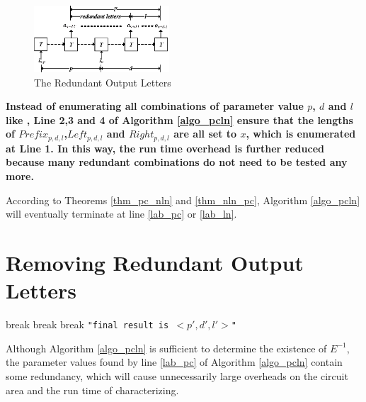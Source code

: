 \documentclass[journal]{IEEEtran}
\begin{document}
\begin{figure}[b]
\begin{center}
\includegraphics[width=0.45\textwidth]{rmred}
\end{center}
\caption{The Redundant Output Letters}
  \label{fig_rmred}
\end{figure}

\textbf{Instead of enumerating all combinations of parameter value $p$, $d$ and $l$ like \cite{ShengYuShen:iccad09,ShengYuShen:tcad},
Line 2,3 and 4 of Algorithm \ref{algo_pcln} ensure that the lengths of $Prefix_{p,d,l}$,$Left_{p,d,l}$ and $Right_{p,d,l}$ are all set to $x$, 
which is enumerated at Line 1.
In this way,
the run time overhead is further reduced because many redundant combinations do not need to be tested any more.}



According to Theorems \ref{thm_pc_nln} and \ref{thm_nln_pc},
Algorithm \ref{algo_pcln} will eventually terminate at line \ref{lab_pc} or \ref{lab_ln}.

\section{Removing Redundant Output Letters}\label{sec_rmred}
\begin{algorithm}
\caption{$RemoveRedundancy(p,d,l)$}
\label{algo_remove}
\begin{algorithmic}[1]
    \STATE break
  \ENDIF
\ENDFOR
{}
    \STATE break
  \ENDIF
\ENDFOR
{}
    \STATE break
  \ENDIF
\ENDFOR
\PRINT \texttt{"final result is $<p',d',l'>$"}
\end{algorithmic}
\end{algorithm}

Although Algorithm \ref{algo_pcln} is sufficient to determine the existence of $E^{-1}$,
the parameter values found by line \ref{lab_pc} of Algorithm \ref{algo_pcln} contain some redundancy,
which will cause unnecessarily large overheads on the circuit area and the run time of characterizing.
\end{document}
